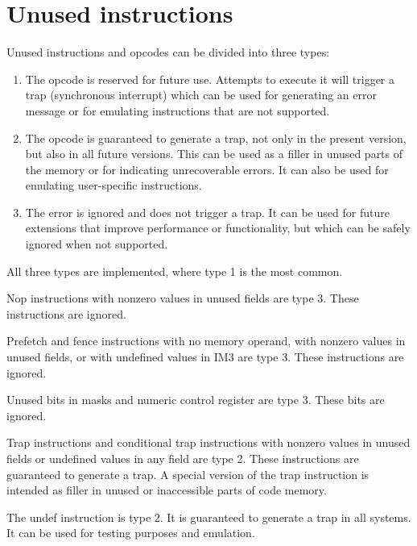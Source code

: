\documentclass[forwardcom.tex]{subfiles}
\begin{document}
\section{Unused instructions} \label{unusedInstructions}
Unused instructions and opcodes can be divided into three types:

\begin{enumerate}
\item The opcode is reserved for future use. Attempts to execute it will trigger a trap (synchronous interrupt) which can be used for generating an error message or for emulating instructions that are not supported.
\item The opcode is guaranteed to generate a trap, not only in the present version, but also in all future versions. This can be used as a filler in unused parts of the memory or for indicating unrecoverable errors. It can also be used for emulating user-specific instructions.
\item The error is ignored and does not trigger a trap. It can be used for future extensions that improve performance or functionality, but which can be safely ignored when not supported.
\end{enumerate}

All three types are implemented, where type 1 is the most common.
\vspace{2mm}

Nop instructions with nonzero values in unused fields are type 3. These instructions are ignored.
\vspace{2mm}

Prefetch and fence instructions with no memory operand, with nonzero values in unused fields, or with undefined values in IM3 are type 3. These instructions are ignored.
\vspace{2mm}

Unused bits in masks and numeric control register are type 3. These bits are ignored.
\vspace{2mm}

Trap instructions and conditional trap instructions with nonzero values in unused fields or undefined values in any field are type 2. These instructions are guaranteed to generate a trap. A special version of the trap instruction is intended as filler in unused or inaccessible parts of code memory.
\vspace{2mm}

The undef instruction is type 2. It is guaranteed to generate a trap in all systems. It can be used for testing purposes and emulation.
\vspace{2mm}
\end{document}
